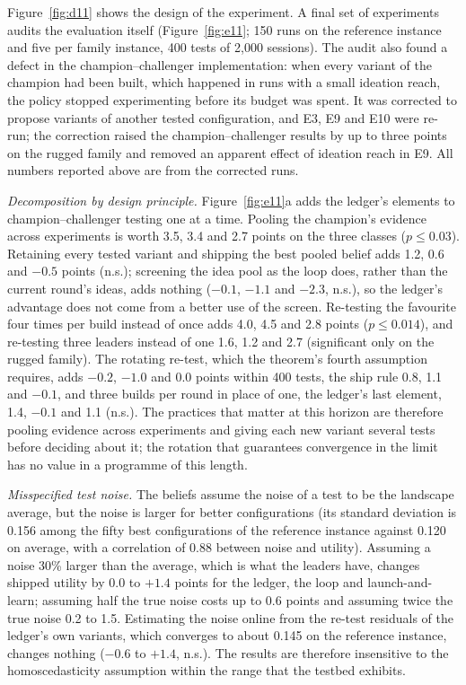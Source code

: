 \documentclass[preprint,12pt,authoryear]{elsarticle}
\theoremstyle{definition}
\begin{document}
Figure~\ref{fig:d11} shows the design of the experiment. A final set of experiments audits the evaluation itself (Figure~\ref{fig:e11}; 150 runs on the reference instance and five per family instance, 400 tests of 2,000 sessions). The audit also found a defect in the champion--challenger implementation: when every variant of the champion had been built, which happened in runs with a small ideation reach, the policy stopped experimenting before its budget was spent. It was corrected to propose variants of another tested configuration, and E3, E9 and E10 were re-run; the correction raised the champion--challenger results by up to three points on the rugged family and removed an apparent effect of ideation reach in E9. All numbers reported above are from the corrected runs.

\emph{Decomposition by design principle.} Figure~\ref{fig:e11}a adds the ledger's elements to champion--challenger testing one at a time. Pooling the champion's evidence across experiments is worth 3.5, 3.4 and 2.7 points on the three classes ($p\le0.03$). Retaining every tested variant and shipping the best pooled belief adds 1.2, 0.6 and $-0.5$ points (n.s.); screening the idea pool as the loop does, rather than the current round's ideas, adds nothing ($-0.1$, $-1.1$ and $-2.3$, n.s.), so the ledger's advantage does not come from a better use of the screen. Re-testing the favourite four times per build instead of once adds 4.0, 4.5 and 2.8 points ($p\le0.014$), and re-testing three leaders instead of one 1.6, 1.2 and 2.7 (significant only on the rugged family). The rotating re-test, which the theorem's fourth assumption requires, adds $-0.2$, $-1.0$ and $0.0$ points within 400 tests, the ship rule 0.8, 1.1 and $-0.1$, and three builds per round in place of one, the ledger's last element, 1.4, $-0.1$ and 1.1 (n.s.). The practices that matter at this horizon are therefore pooling evidence across experiments and giving each new variant several tests before deciding about it; the rotation that guarantees convergence in the limit has no value in a programme of this length.

\emph{Misspecified test noise.} The beliefs assume the noise of a test to be the landscape average, but the noise is larger for better configurations (its standard deviation is 0.156 among the fifty best configurations of the reference instance against 0.120 on average, with a correlation of 0.88 between noise and utility). Assuming a noise 30\% larger than the average, which is what the leaders have, changes shipped utility by $0.0$ to $+1.4$ points for the ledger, the loop and launch-and-learn; assuming half the true noise costs up to 0.6 points and assuming twice the true noise 0.2 to 1.5. Estimating the noise online from the re-test residuals of the ledger's own variants, which converges to about 0.145 on the reference instance, changes nothing ($-0.6$ to $+1.4$, n.s.). The results are therefore insensitive to the homoscedasticity assumption within the range that the testbed exhibits.
\end{document}
